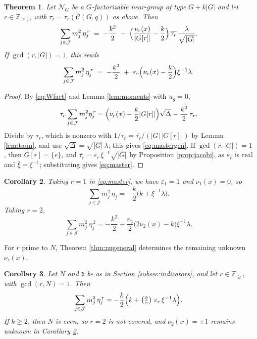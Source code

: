 \documentclass[10pt]{article}
\theoremstyle{plain}
\newtheorem{theorem}{Theorem}[section]
\newtheorem{corollary}[theorem]{Corollary}
\theoremstyle{definition}
\theoremstyle{plain}
\newcommand{\Jac}[2]{\left(\tfrac{#1}{#2}\right)}
\begin{document}
\begin{theorem}\label{thm:master}
Let $\mathcal{N}_G$ be a $G$-factorizable near-group of type $G+k|G|$ and let $r\in\mathbb{Z}_{\geq1}$, with $\tau_r=\tau_r(\mathcal{C}(G,q))$ as above. Then
\begin{equation}\label{eq:mastergen}
  \sum_{j\in\mathcal{J}}m_j^2\,\eta_j^{\,r}
  \;=\;-\frac{k^2}{2}\;+\;\Bigl(\frac{\nu_r(x)}{|G[r]|}-\frac{k}{2}\Bigr)\,\overline{\tau_r}\,\frac{\lambda}{\sqrt{|G|}} .
\end{equation}
If $\gcd(r,|G|)=1$, this reads
\begin{equation}\label{eq:master}
  \sum_{j\in\mathcal{J}}m_j^2\,\eta_j^{\,r}
  \;=\;-\frac{k^2}{2}\;+\;\varepsilon_r\Bigl(\nu_r(x)-\frac{k}{2}\Bigr)\xi^{-1}\lambda .
\end{equation}
\end{theorem}

\begin{proof}
By \eqref{eq:Wfact} and Lemma \ref{lem:moments} with $u_g=0$,
\[
  \tau_r\sum_{j\in\mathcal{J}}m_j^2\eta_j^{\,r}=\Bigl(\nu_r(x)-\frac k2|G[r]|\Bigr)\sqrt\Delta-\frac{k^2}{2}\,\tau_r .
\]
Divide by $\tau_r$, which is nonzero with $1/\tau_r=\overline{\tau_r}/(|G|\,|G[r]|)$ by Lemma \ref{lem:taun}, and use $\sqrt\Delta=\sqrt{|G|}\,\lambda$; this gives \eqref{eq:mastergen}. If $\gcd(r,|G|)=1$, then $G[r]=\{e\}$, and $\overline{\tau_r}=\varepsilon_r\,\xi^{-1}\sqrt{|G|}$ by Proposition \ref{prop:jacobi}, as $\varepsilon_r$ is real and $\overline{\xi}=\xi^{-1}$; substituting gives \eqref{eq:master}.
\end{proof}

\begin{corollary}\label{cor:n12}
Taking $r=1$ in \eqref{eq:master}, we have $\varepsilon_1=1$ and $\nu_1(x)=0$,
so
\[
  \sum_{j\in\mathcal{J}}m_j^2\,\eta_j=-\frac{k}{2}\bigl(k+\xi^{-1}\lambda\bigr).
\]
Taking $r=2$,
\[
  \sum_{j\in\mathcal{J}}m_j^2\,\eta_j^{\,2}
  =-\frac{k^2}{2}+\frac{\varepsilon_2}{2}\bigl(2\nu_2(x)-k\bigr)\xi^{-1}\lambda .
\]
\end{corollary}


For $r$ prime to $N$, Theorem \ref{thm:nugeneral} determines the remaining unknown $\nu_r(x)$.

\begin{corollary}\label{prop:nun}
Let $N$ and $\mathfrak{d}$ be as in Section \ref{subsec:indicators}, and let $r\in\mathbb{Z}_{\geq1}$ with $\gcd(r,N)=1$. Then
\begin{equation}\label{eq:nun}
  \sum_{j\in\mathcal{J}}m_j^2\,\eta_j^{\,r}
  =-\frac{k}{2}\Bigl(k+\Jac{\mathfrak{d}}{r}\,\varepsilon_r\,\xi^{-1}\lambda\Bigr).
\end{equation}
If $k\geq2$, then $N$ is even, so $r=2$ is not covered, and $\nu_2(x)=\pm1$ remains unknown in Corollary \ref{cor:n12}.
\end{corollary}
\end{document}
